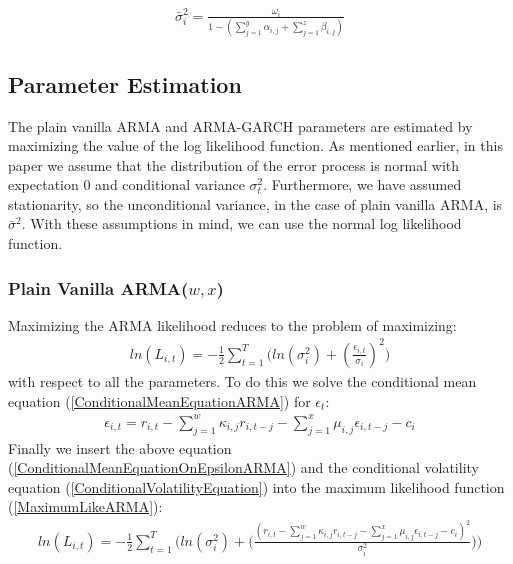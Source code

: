\begin{align}
    \bar{\sigma}_i^2=\frac{\omega_i}{1-(\sum_{j=1}^y\alpha_{i,j}+\sum_{j=1}^z\beta_{i,j})} \label{longTermVolatilityGARCH}
\end{align}

\subsection*{Parameter Estimation}

The plain vanilla ARMA and ARMA-GARCH parameters are estimated by maximizing the value of the log likelihood function. As mentioned earlier, in this paper we assume that the distribution of the error process is normal with expectation 0 and conditional variance ${\sigma_t^2}$. Furthermore, we have assumed stationarity, so the unconditional variance, in the case of plain vanilla ARMA, is ${\bar\sigma^2}$. With these assumptions in mind, we can use the normal log likelihood function.
\subsubsection{Plain Vanilla ARMA($w,x$)}
Maximizing the ARMA likelihood reduces to the problem of maximizing:
\begin{align} 
    ln(L_{i,t})=-\frac{1}{2}\sum_{t=1}^T\bigg( ln(\sigma_{i}^2)+(\frac{\epsilon_{i,t}}{\sigma_i})^2\bigg)  \label{MaximumLikeARMA}
\end{align}
with respect to all the parameters. To do this we solve the conditional mean equation (\ref{ConditionalMeanEquationARMA}) for $\epsilon_t$:
\begin{align}
     \epsilon_{i,t}=r_{i,t}-\sum_{j=1}^w\kappa_{i,j} r_{i,t-j}-\sum_{j=1}^x\mu_{i,j} \epsilon_{i,t-j}-c_i \label{ConditionalMeanEquationOnEpsilon}
\end{align}
Finally we insert the above equation (\ref{ConditionalMeanEquationOnEpsilonARMA}) and the conditional volatility equation (\ref{ConditionalVolatilityEquation}) into the maximum likelihood function (\ref{MaximumLikeARMA}):
\begin{align} 
    ln(L_{i,t})=-\frac{1}{2}\sum_{t=1}^T\Bigg( ln(\sigma_i^2)+\Big(\frac{(r_{i,t}-\sum_{j=1}^w\kappa_{i,j} r_{i,t-j}-\sum_{j=1}^x\mu_{i,j} \epsilon_{i,t-j}-c_i)^2}{\sigma_i^2}\Big)\Bigg)  \label{fullMaximumLikeARMA}
\end{align}

